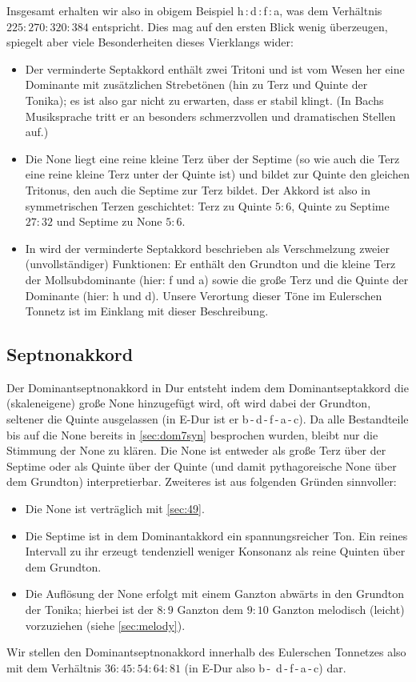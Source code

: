Insgesamt erhalten wir also in obigem Beispiel \naturalm
h\,:\,d\,:\,f\,:\,\flatp a, was dem Verhältnis $225:270:320:384$ entspricht.
Dies mag auf den ersten Blick wenig überzeugen, spiegelt aber viele
Besonderheiten dieses Vierklangs wider:
\begin{itemize}
\item Der verminderte Septakkord enthält zwei Tritoni und ist vom Wesen her eine
  Dominante mit zusätzlichen Strebetönen (hin zu Terz und Quinte der Tonika); es
  ist also gar nicht zu erwarten, dass er stabil klingt.  (In Bachs Musiksprache
  tritt er an besonders schmerzvollen und dramatischen Stellen auf.)
\item Die None liegt eine reine kleine Terz über der Septime (so wie auch die
  Terz eine reine kleine Terz unter der Quinte ist) und bildet zur Quinte den
  gleichen Tritonus, den auch die Septime zur Terz bildet.  Der Akkord ist also
  in symmetrischen Terzen geschichtet: Terz zu Quinte $5:6$, Quinte zu Septime
  $27:32$ und Septime zu None $5:6$.
\item In \cite[S.\,92ff.]{deLaMotte} wird der verminderte Septakkord beschrieben
  als Verschmelzung zweier (unvollständiger) Funktionen: Er enthält den Grundton
  und die kleine Terz der Mollsubdominante (hier: f und \flat a) sowie die große
  Terz und die Quinte der Dominante (hier: h und d).  Unsere Verortung dieser
  Töne im Eulerschen Tonnetz ist im Einklang mit dieser Beschreibung.
\end{itemize}

\subsection{Septnonakkord}

Der Dominantseptnonakkord in Dur entsteht indem dem Dominantseptakkord die
(skaleneigene) große None hinzugefügt wird, oft wird dabei der Grundton,
seltener die Quinte ausgelassen (in \flat E-Dur ist er \flat
b\,-\,d\,-\,f\,-\,\flat a\,-\,c).  Da alle Bestandteile bis auf die None bereits
in \cref{sec:dom7syn} besprochen wurden, bleibt nur die Stimmung der None zu
klären.  Die None ist entweder als große Terz über der Septime oder als Quinte
über der Quinte (und damit pythagoreische None über dem Grundton)
interpretierbar.  Zweiteres ist aus folgenden Gründen sinnvoller:

\begin{itemize}
  \item Die None ist verträglich mit \cref{sec:49}.
  \item Die Septime ist in dem Dominantakkord ein spannungsreicher Ton.  Ein
  reines Intervall zu ihr erzeugt tendenziell weniger Konsonanz als reine
  Quinten über dem Grundton.
  \item Die Auflösung der None erfolgt mit einem Ganzton abwärts in den Grundton
  der Tonika; hierbei ist der $8:9$ Ganzton dem $9:10$ Ganzton melodisch
  (leicht) vorzuziehen (siehe \cref{sec:melody}).
\end{itemize}
Wir stellen den Dominantseptnonakkord innerhalb des Eulerschen Tonnetzes also
mit dem Verhältnis $36:45:54:64:81$ (in \flat E-Dur also \flat b\,-\,\naturalm
d\,-\,f\,-\,\flat a\,-\,c) dar.

